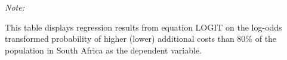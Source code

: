 \begin{table}[htbp!]
\begin{adjustbox}{width = 1\textwidth, max height = 0.95\textheight, center}
\begin{threeparttable}[b]
         \begin{tablenotes}\item \medskip \textit{Note:}
            \item This table displays regression results from equation LOGIT on the log-odds transformed probability of higher (lower) additional costs than 80\% of the population in South Africa as the dependent variable. 
         \end{tablenotes}
      \end{threeparttable}
   \end{adjustbox}
\end{table}



